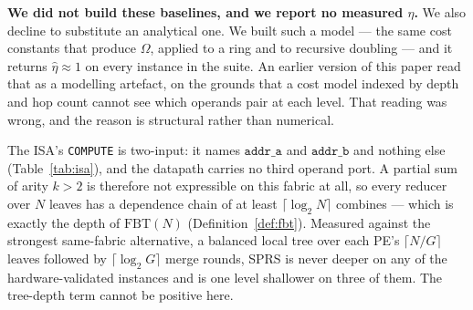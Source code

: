 \documentclass[journal,10pt]{IEEEtran}
\theoremstyle{plain}
\theoremstyle{definition}
\theoremstyle{remark}
\newcommand{\FBT}{\ensuremath{\mathrm{FBT}}}
\newcommand{\sprs}{\textsc{SPRS}}
\begin{document}
\textbf{We did not build these baselines, and we report no measured $\eta$.}
We also decline to substitute an analytical one. We built such a model --- the
same cost constants that produce $\Omega$, applied to a ring and to recursive
doubling --- and it returns $\hat\eta \approx 1$ on every instance in the
suite. An earlier version of this paper read that as a modelling artefact, on
the grounds that a cost model indexed by depth and hop count cannot see which
operands pair at each level. That reading was wrong, and the reason is
structural rather than numerical.

The ISA's \texttt{COMPUTE} is two-input: it names $\texttt{addr\_a}$ and
$\texttt{addr\_b}$ and nothing else (Table~\ref{tab:isa}), and the datapath
carries no third operand port. A partial sum of arity $k > 2$ is therefore not
expressible on this fabric at all, so every reducer over $N$ leaves has a
dependence chain of at least $\lceil \log_2 N \rceil$ combines --- which is
exactly the depth of $\FBT(N)$ (Definition~\ref{def:fbt}). Measured against
the strongest same-fabric alternative, a balanced local tree over each PE's
$\lceil N/G \rceil$ leaves followed by $\lceil \log_2 G \rceil$ merge
rounds, \sprs{} is never deeper on any of the \TournNInst{}
hardware-validated instances and is one level shallower on three of them. The
tree-depth term cannot be positive here.
\end{document}
